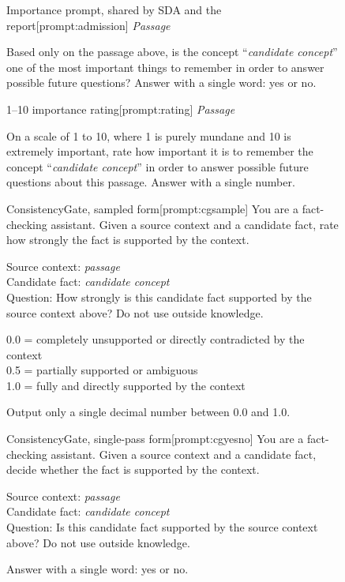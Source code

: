 \begin{figure}[tp]
\begin{sdabox}[prompt]{Importance prompt, shared by SDA and the report}[prompt:admission]
\emph{Passage}

Based only on the passage above, is the concept ``\emph{candidate
concept}'' one of the most important things to remember in order to
answer possible future questions? Answer with a single word: yes or no.
\end{sdabox}
\end{figure}

\begin{figure}[tp]
\begin{sdabox}[prompt]{1--10 importance rating}[prompt:rating]
\emph{Passage}

On a scale of 1 to 10, where 1 is purely mundane and 10 is extremely
important, rate how important it is to remember the concept
``\emph{candidate concept}'' in order to answer possible future questions
about this passage. Answer with a single number.
\end{sdabox}
\end{figure}

\begin{figure}[tp]
\begin{sdabox}[prompt]{ConsistencyGate, sampled form}[prompt:cgsample]
You are a fact-checking assistant. Given a source context and a
candidate fact, rate how strongly the fact is supported by the context.

Source context: \emph{passage}\\
Candidate fact: \emph{candidate concept}\\
Question: How strongly is this candidate fact supported by the source
context above? Do not use outside knowledge.

0.0 = completely unsupported or directly contradicted by the context\\
0.5 = partially supported or ambiguous\\
1.0 = fully and directly supported by the context

Output only a single decimal number between 0.0 and 1.0.
\end{sdabox}
\end{figure}

\begin{figure}[tp]
\begin{sdabox}[prompt]{ConsistencyGate, single-pass form}[prompt:cgyesno]
You are a fact-checking assistant. Given a source context and a
candidate fact, decide whether the fact is supported by the context.

Source context: \emph{passage}\\
Candidate fact: \emph{candidate concept}\\
Question: Is this candidate fact supported by the source context above?
Do not use outside knowledge.

Answer with a single word: yes or no.
\end{sdabox}
\end{figure}

